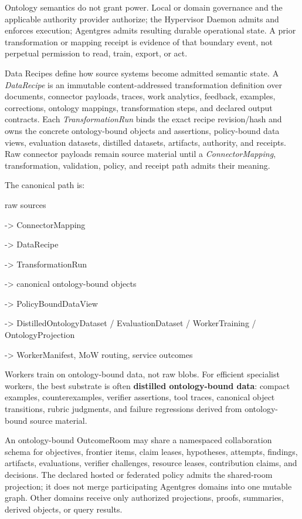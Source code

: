 \documentclass[
  11pt,
]{article}
\begin{document}
Ontology semantics do not grant power. Local or domain governance and the
applicable authority provider authorize; the Hypervisor Daemon admits and
enforces execution; Agentgres admits resulting durable operational state. A
prior transformation or mapping receipt is evidence of that boundary event,
not perpetual permission to read, train, export, or act.

Data Recipes define how source systems become admitted semantic state. A
\emph{DataRecipe} is an immutable content-addressed transformation definition
over documents, connector payloads, traces, work analytics, feedback, examples,
corrections, ontology mappings, transformation steps, and declared output
contracts. Each \emph{TransformationRun} binds the exact recipe revision/hash
and owns the concrete ontology-bound objects and assertions, policy-bound data
views, evaluation datasets, distilled datasets, artifacts, authority, and
receipts. Raw connector payloads
remain source material until a \emph{ConnectorMapping}, transformation,
validation, policy, and receipt path admits their meaning.

The canonical path is:

raw sources

-\textgreater{} ConnectorMapping

-\textgreater{} DataRecipe

-\textgreater{} TransformationRun

-\textgreater{} canonical ontology-bound objects

-\textgreater{} PolicyBoundDataView

-\textgreater{} DistilledOntologyDataset / EvaluationDataset /
WorkerTraining / OntologyProjection

-\textgreater{} WorkerManifest, MoW routing, service outcomes

Workers train on ontology-bound data, not raw blobs. For efficient
specialist workers, the best substrate is often \textbf{distilled
ontology-bound data}: compact examples, counterexamples, verifier
assertions, tool traces, canonical object transitions, rubric judgments,
and failure regressions derived from ontology-bound source material.

An ontology-bound OutcomeRoom may share a namespaced collaboration schema for
objectives, frontier items, claim leases, hypotheses, attempts, findings,
artifacts, evaluations, verifier challenges, resource leases, contribution
claims, and decisions. The declared hosted or federated policy admits the
shared-room projection; it does not merge participating Agentgres domains into
one mutable graph. Other domains receive only authorized projections, proofs,
summaries, derived objects, or query results.
\end{document}
